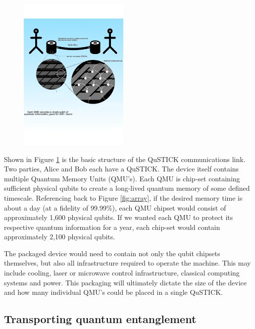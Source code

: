 \documentclass[twocolumn, aps, rmp, amsmath, amssymb, nofootinbib, superscriptaddress, longbibliography, floatfix, table-of-contents, eqsecnum]{revtex4-2}
\begin{document}
\begin{figure}[htbp!]
	\includegraphics[clip=true, width=0.475\textwidth]{qustick1}
	\caption{}
	\label{fig:qustick1}
\end{figure}

Shown in Figure \ref{fig:qustick1} is the basic structure of the QuSTICK communications link. Two parties, Alice and Bob each have a QuSTICK. The device itself contains multiple Quantum Memory Units (QMU's). Each QMU is chip-set containing sufficient physical qubits to create a long-lived quantum memory of some defined timescale. Referencing back to Figure \ref{fig:array}, if the desired memory time is about a day (at a fidelity of 99.99\%), each QMU chipset would consist of approximately 1,600 physical qubits. If we wanted each QMU to protect its respective quantum information for a year, each chip-set would contain approximately 2,100 physical qubits. 

The packaged device would need to contain not only the qubit chipsets themselves, but also all infrastructure required to operate the machine. This may include cooling, laser or microwave control infrastructure, classical computing systems and power. This packaging will ultimately dictate the size of the device and how many individual QMU's could be placed in a single QuSTICK.

\subsection{Transporting quantum entanglement}
\end{document}
